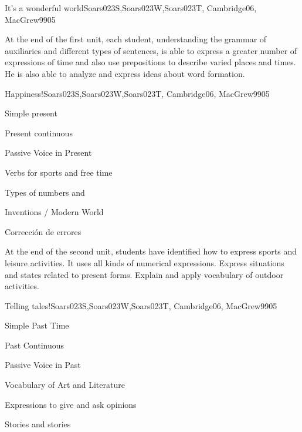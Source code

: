 \begin{syllabus}
\begin{unit}{It's a wonderful world}{}{Soars023S,Soars023W,Soars023T, Cambridge06, MacGrew99}{0}{5}
   \begin{learningoutcomes}
      \item At the end of the first unit, each student, understanding the grammar of auxiliaries and different types of sentences, is able to express a greater number of expressions of time and also use prepositions to describe varied places and times. He is also able to analyze and express ideas about word formation.
   \end{learningoutcomes}
\end{unit}

\begin{unit}{Happiness!}{}{Soars023S,Soars023W,Soars023T, Cambridge06, MacGrew99}{0}{5}
   \begin{topics}
      \item Simple present
      \item Present continuous
      \item Passive Voice in Present
      \item Verbs for sports and free time
      \item Types of numbers and 
      \item Inventions / Modern World
      \item Corrección de errores
   \end{topics}

   \begin{learningoutcomes}
      \item  At the end of the second unit, students have identified how to express sports and leisure activities. It uses all kinds of numerical expressions. Express situations and states related to present forms. Explain and apply vocabulary of outdoor activities.
   \end{learningoutcomes}
\end{unit}

\begin{unit}{Telling tales!}{}{Soars023S,Soars023W,Soars023T, Cambridge06, MacGrew99}{0}{5}
   \begin{topics}
      \item Simple Past Time
      \item Past Continuous
      \item Passive Voice in Past
      \item Vocabulary of Art and Literature
      \item Expressions to give and ask opinions
      \item Stories and stories
   \end{topics}


\end{unit}
\end{syllabus}
